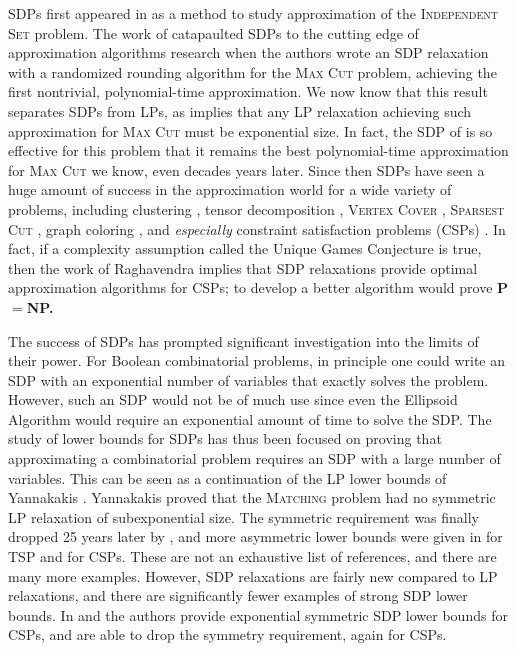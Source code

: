SDPs first appeared in \cite{Lovasz79} as a method to study approximation of the \textsc{Independent Set} problem. The work of \cite{GW95} catapaulted SDPs to the cutting edge of approximation algorithms research when the authors wrote an SDP relaxation with a randomized rounding algorithm for the \textsc{Max Cut} problem, achieving the first nontrivial, polynomial-time approximation. We now know that this result separates SDPs from LPs, as \cite{CLRS16} implies that any LP relaxation achieving such approximation for \textsc{Max Cut} must be exponential size. In fact, the SDP of \cite{GW95} is so effective for this problem that it remains the best polynomial-time approximation for \textsc{Max Cut} we know, even decades years later. Since then SDPs have seen a huge amount of success in the approximation world for a wide variety of problems, including clustering \cite{PW07}, tensor decomposition \cite{TS15}, \textsc{Vertex Cover} \cite{Kar09}, \textsc{Sparsest Cut} \cite{ARV09}, graph coloring \cite{Chlam07}, and \emph{especially} constraint satisfaction problems (CSPs) \cite{FJ97,HZ99,CMM09}. In fact, if a complexity assumption called the Unique Games Conjecture \cite{Khot02} is true, then the work of Raghavendra \cite{Ragh08} implies that SDP relaxations provide optimal approximation algorithms for CSPs; to develop a better algorithm would prove \bf{P}$ = $\bf{NP}. 

The success of SDPs has prompted significant investigation into the limits of their power. For Boolean combinatorial problems, in principle one could write an SDP with an exponential number of variables that exactly solves the problem. However, such an SDP would not be of much use since even the Ellipsoid Algorithm would require an exponential amount of time to solve the SDP. The study of lower bounds for SDPs has thus been focused on proving that approximating a combinatorial problem requires an SDP with a large number of variables. This can be seen as a continuation of the LP lower bounds of Yannakakis \cite{Yann88}. Yannakakis proved that the \textsc{Matching} problem had no symmetric LP relaxation of subexponential size. The symmetric requirement was finally dropped 25 years later by \cite{Roth14}, and more asymmetric lower bounds were given in \cite{FMPTHW15} for \textsc{TSP} and \cite{CLRS15} for CSPs. 
These are not an exhaustive list of references, and there are many more examples.
However, SDP relaxations are fairly new compared to LP relaxations, and there are significantly fewer examples of strong SDP lower bounds. In \cite{FSP13} and \cite{LRST14} the authors provide exponential symmetric SDP lower bounds for CSPs, and \cite{LRS15} are able to drop the symmetry requirement, again for CSPs.

